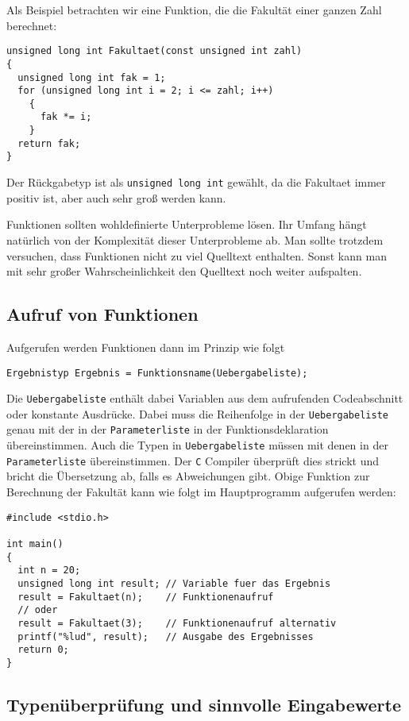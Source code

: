 Als Beispiel betrachten wir eine Funktion, die die Fakultät einer ganzen Zahl berechnet:
\begin{lstlisting}
unsigned long int Fakultaet(const unsigned int zahl)
{
  unsigned long int fak = 1;
  for (unsigned long int i = 2; i <= zahl; i++)
    {
      fak *= i;
    }
  return fak;
}
\end{lstlisting}
Der Rückgabetyp ist als \verb|unsigned long int| gewählt, da die Fakultaet immer positiv ist, aber auch sehr groß werden kann.

Funktionen sollten wohldefinierte Unterprobleme lösen.
Ihr Umfang hängt natürlich von der Komplexität dieser Unterprobleme ab.
Man sollte trotzdem versuchen, dass Funktionen nicht zu viel Quelltext enthalten.
Sonst kann man mit sehr großer Wahrscheinlichkeit den Quelltext noch weiter aufspalten.

\subsection{Aufruf von Funktionen}

Aufgerufen werden Funktionen dann im Prinzip wie folgt
\begin{lstlisting}
Ergebnistyp Ergebnis = Funktionsname(Uebergabeliste);
\end{lstlisting}
Die \verb|Uebergabeliste| enthält dabei Variablen aus dem aufrufenden Codeabschnitt oder konstante Ausdrücke.
Dabei muss die Reihenfolge in der \verb|Uebergabeliste| genau mit der in der \verb|Parameterliste| in der Funktionsdeklaration übereinstimmen.
Auch die Typen in \verb|Uebergabeliste| müssen mit denen in der \verb|Parameterliste| übereinstimmen.
Der \texttt{C} Compiler überprüft dies strickt und bricht die Übersetzung ab, falls es Abweichungen gibt.
Obige Funktion zur Berechnung der Fakultät kann wie folgt im Hauptprogramm aufgerufen werden:
\begin{lstlisting}
#include <stdio.h>

int main()
{
  int n = 20;
  unsigned long int result; // Variable fuer das Ergebnis
  result = Fakultaet(n);    // Funktionenaufruf
  // oder
  result = Fakultaet(3);    // Funktionenaufruf alternativ
  printf("%lud", result);   // Ausgabe des Ergebnisses
  return 0;
}
\end{lstlisting}

\subsection{Typenüberprüfung und sinnvolle Eingabewerte}

